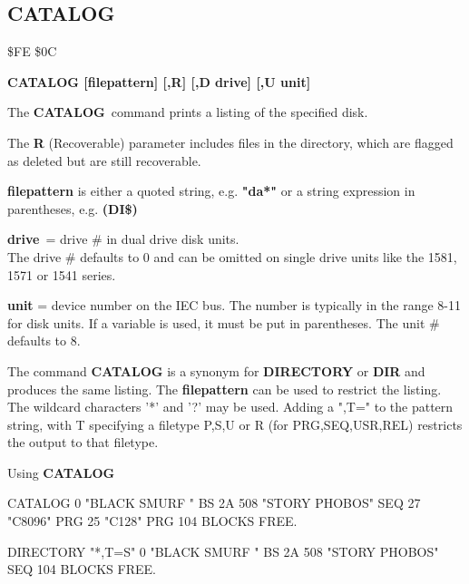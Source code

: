 
\newpage
\subsection{CATALOG}
\begin{description}[leftmargin=3cm,style=nextline]
\item [Token:] \$FE \$0C
\item [Format:] {\bf CATALOG [filepattern] [,R] [,D drive] [,U unit] }
\item [Usage:]
   The {\bf CATALOG} command prints a listing
   of the specified disk.

   The {\bf R} (Recoverable) parameter includes files in the
   directory, which are flagged as deleted but are still
   recoverable.

   {\bf filepattern} is either a quoted string, e.g. {\bf "da*"} or
   a string expression in parentheses, e.g. {\bf (DI\$)}

   {\bf drive} = drive \# in dual drive disk units. \\
   The drive \# defaults to 0 and can be omitted on single drive units
   like the 1581, 1571 or 1541 series.

   {\bf unit} = device number on the IEC bus.
   The number is typically in the range 8-11 for disk units.
   If a variable is used, it must be put in parentheses.
   The unit \# defaults to 8.

\item [Remarks:]
   The command {\bf CATALOG} is a synonym for {\bf DIRECTORY}
   or {\bf DIR} and produces the same listing.
   The {\bf filepattern} can be used to restrict the listing.
   The wildcard characters '*' and '?' may be used.
   Adding a ",T=" to the pattern string, with T specifying
   a filetype P,S,U or R (for PRG,SEQ,USR,REL) restricts the
   output to that filetype.

\item [Example:] Using {\bf CATALOG}
\begin{screenoutput}
CATALOG
  0 "BLACK SMURF     " BS  2A
508 "STORY PHOBOS"         SEQ
27  "C8096"                PRG
25  "C128"                 PRG
104 BLOCKS FREE.

DIRECTORY "*,T=S"
  0 "BLACK SMURF     " BS  2A
508 "STORY PHOBOS"         SEQ
104 BLOCKS FREE.
\end{screenoutput}
\end{description}


